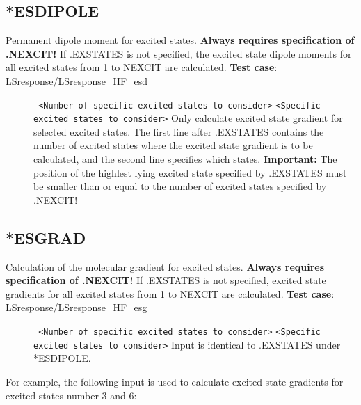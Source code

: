 \subsection{*ESDIPOLE}\label{subsec:esd}
Permanent dipole moment for excited states.
{\bf Always requires specification of .NEXCIT!}
If .EXSTATES is not specified, the excited state dipole moments
for all excited states from 1 to NEXCIT
are calculated. \newline
{\bf Test case}: LSresponse/LSresponse\_HF\_esd
\begin{description}
\item[] \verb| | \newline
\verb|<Number of specific excited states to consider>|\newline
\verb|<Specific excited states to consider>|\newline
Only calculate excited state gradient for selected excited states.
The first line after .EXSTATES contains the number
of excited states where the excited state gradient is to be calculated,
and the second line specifies which states.
{\bf Important:} The position of the highlest lying excited state
specified by .EXSTATES must be smaller than or equal to
the number of excited states specified by .NEXCIT!
\end{description}

\subsection{*ESGRAD}\label{subsec:esg}
Calculation of the molecular gradient for excited states.
{\bf Always requires specification of .NEXCIT!}
If .EXSTATES is not specified, excited state gradients
for all excited states from 1 to NEXCIT
are calculated. \newline
{\bf Test case}: LSresponse/LSresponse\_HF\_esg 
\begin{description}
\item[] \verb| | \newline
\verb|<Number of specific excited states to consider>|\newline
\verb|<Specific excited states to consider>|\newline
Input is identical to .EXSTATES under *ESDIPOLE.
\end{description}
For example, the following input is used 
to calculate excited state gradients for excited states number 3 and 6:
\begin{description}
\item[]
\item[]
\item[]
\item[]
\item[]
\item[]
\item[]
\end{description}


